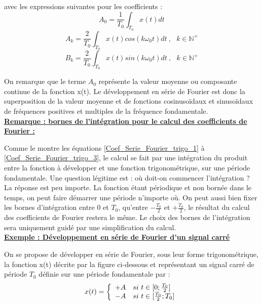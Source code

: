 	avec les expressions suivantes pour les coefficients :
	\begin{equation}\label{Coef_Serie_Fourier_trigo_1}
	A_{0}=\frac{1}{T_{0}}\int_{T_{0}}x(t)dt
	\end{equation}
	\begin{equation}\label{Coef_Serie_Fourier_trigo_2}
	A_{k}=\frac{2}{T_{0}}\int_{T_{0}}x(t)cos(k\omega_{0}t)dt~,~~~k \in \mathbb{N}^{+}
	\end{equation}
	\begin{equation}\label{Coef_Serie_Fourier_trigo_3}
	B_{k}=\frac{2}{T_{0}}\int_{T_{0}}x(t)sin(k\omega_{0}t)dt~,~~~k \in \mathbb{N}^{+}
	\end{equation}
	
	On remarque que le terme $A_{0}$ représente la valeur moyenne ou composante continue de la fonction x(t). Le développement en série de Fourier est donc la superposition de la valeur moyenne et de fonctions cosinusoïdaux et sinusoïdaux de fréquences positives et multiples de la fréquence fondamentale. \\
	
	\underline{\textbf{Remarque : bornes de l'intégration pour le calcul des coefficients de Fourier :}}
	
	Comme le montre les équations \ref{Coef_Serie_Fourier_trigo_1} à \ref{Coef_Serie_Fourier_trigo_3}, le calcul se fait par une intégration du produit entre la fonction à développer et une fonction trigonométrique, sur une période fondamentale. Une question légitime est : où doit-on commencer l'intégration ? La réponse est peu importe. La fonction étant périodique et non bornée dans le temps, on peut faire démarrer une période n'importe où. On peut aussi bien fixer les bornes d'intégration entre 0 et $T_0$, qu'entre $-\frac{T_0}{2}$ et $+\frac{T_0}{2}$, le résultat du calcul des coefficients de Fourier restera le même. Le choix des bornes de l'intégration sera uniquement guidé par une simplification du calcul.\\ 
	
	
	
	\underline{\textbf{Exemple : Développement en série de Fourier d'un signal carré\\}}
	
	On se propose de développer en série de Fourier, sous leur forme trigonométrique, la fonction x(t) décrite par la figure ci-dessous et représentant un signal carré de période $T_{0}$ définie sur une période fondamentale par :
	\begin{equation*}
	x(t)=\left \{
	\begin{array}{l l}
	+A   & si~t \in [0;\frac{T_{0}}{2}] \\
	-A   & si~t \in [\frac{T_{0}}{2};T_{0}] \\
	\end{array}
	\right .
	\end{equation*}
	
